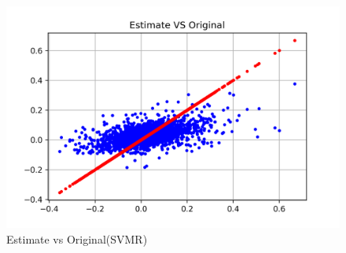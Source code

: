{\begin{figure}[h!]
	\centering
	\includegraphics[width=1\linewidth]{Figure/svmr_estiorg.png}
	\caption{Estimate vs Original(SVMR)} 
	\label{fig:svmr_eo}
\end{figure}
} \\

\newpage